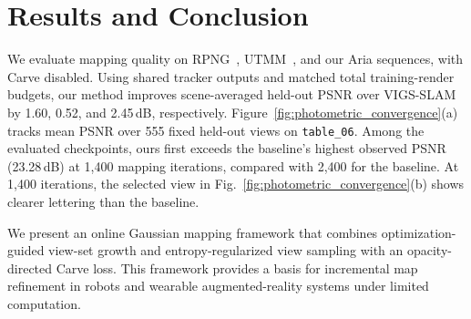 
\caption{Photometric convergence on RPNG~\cite{chen2023monocular} \texttt{table\_06}.
  (a) Mean held-out PSNR, with the y-axis compressed below 19\,dB.
  (b) VIGS-SLAM~\cite{zhu2026vigs} and ours at 1.4k iterations,
  alongside ground truth, with enlarged regions.
  $^{*}$First evaluated attainment of the baseline's highest observed PSNR.}

\section{Results and Conclusion}

We evaluate mapping quality on RPNG~\cite{chen2023monocular},
UTMM~\cite{sun2024mm3dgs}, and our Aria sequences, with Carve disabled.
Using shared tracker outputs and matched total training-render budgets,
our method improves scene-averaged held-out PSNR over
VIGS-SLAM~\cite{zhu2026vigs} by 1.60, 0.52, and 2.45\,dB, respectively.
Figure~\ref{fig:photometric_convergence}(a) tracks mean PSNR over
555 fixed held-out views on \texttt{table\_06}.
Among the evaluated checkpoints, ours first exceeds the baseline's highest
observed PSNR (23.28\,dB) at 1,400 mapping iterations, compared with
2,400 for the baseline.
At 1,400 iterations, the selected view in
Fig.~\ref{fig:photometric_convergence}(b) shows clearer lettering than the baseline.

We present an online Gaussian mapping framework that combines
optimization-guided view-set growth and entropy-regularized view sampling
with an opacity-directed Carve loss.
This framework provides a basis for incremental map refinement in robots
and wearable augmented-reality systems under limited computation.
